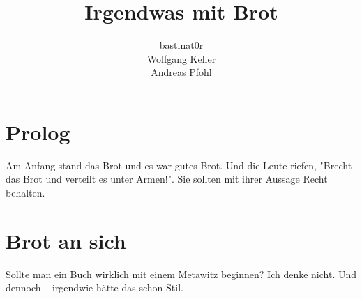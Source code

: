 \documentclass{scrbook}
\title{Irgendwas mit Brot}
\author{bastinat0r \\ Wolfgang Keller \\ Andreas Pfohl}
\begin{document}
\maketitle

\chapter*{Prolog}
Am Anfang stand das Brot und es war gutes Brot. Und die Leute riefen,
"Brecht das Brot und verteilt es unter Armen!". Sie sollten mit ihrer Aussage
Recht behalten.

\chapter{Brot an sich}
Sollte man ein Buch wirklich mit einem Metawitz beginnen? Ich denke nicht. Und
dennoch – irgendwie hätte das schon Stil.
\end{document}
